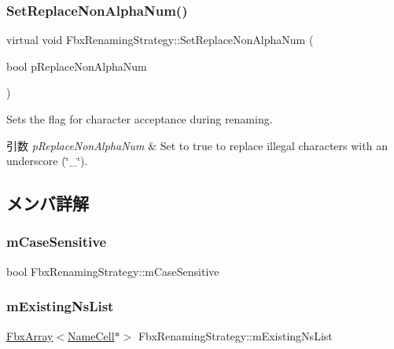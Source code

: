 \subsubsection{\texorpdfstring{Set\+Replace\+Non\+Alpha\+Num()}{SetReplaceNonAlphaNum()}}
{\footnotesize\ttfamily virtual void Fbx\+Renaming\+Strategy\+::\+Set\+Replace\+Non\+Alpha\+Num (\begin{DoxyParamCaption}\item[{bool}]{p\+Replace\+Non\+Alpha\+Num }\end{DoxyParamCaption})\hspace{0.3cm}{\ttfamily [virtual]}}

Sets the flag for character acceptance during renaming. 
\begin{DoxyParams}{引数}
{\em p\+Replace\+Non\+Alpha\+Num} & Set to {\ttfamily true} to replace illegal characters with an underscore (\char`\"{}\+\_\+\char`\"{}). \\
\hline
\end{DoxyParams}


\subsection{メンバ詳解}
\mbox{\label{class_fbx_renaming_strategy_a6bce5341bf85474e9c3f0a891c18fc80}} 
\subsubsection{\texorpdfstring{m\+Case\+Sensitive}{mCaseSensitive}}
{\footnotesize\ttfamily bool Fbx\+Renaming\+Strategy\+::m\+Case\+Sensitive\hspace{0.3cm}{\ttfamily [protected]}}

\mbox{\label{class_fbx_renaming_strategy_a72b25f3cb4d18be1e8d5301fb27dad8b}} 
\subsubsection{\texorpdfstring{m\+Existing\+Ns\+List}{mExistingNsList}}
{\footnotesize\ttfamily \hyperlink{class_fbx_array}{Fbx\+Array}$<$\hyperlink{struct_fbx_renaming_strategy_1_1_name_cell}{Name\+Cell}$\ast$$>$ Fbx\+Renaming\+Strategy\+::m\+Existing\+Ns\+List\hspace{0.3cm}{\ttfamily [protected]}}

